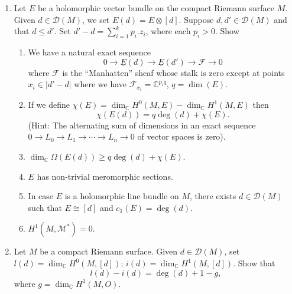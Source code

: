 \begin{enumerate}
\begin{enumerate}[label=\alph*)]
Show that if $(f_1,\ldots,f_m)$ is a regular sequence, then the Koszul complex is exact (Hint: prove by induction on $m$. See also Griffiths and Harris \cite[pages 688--690]{bib:II:griffiths-p-and-harris-j:1}).
\end{enumerate}
Now suppose that $p_j\in\mathbb{C}[z_0,\ldots,z_n]$ is homogeneous of degree $d_j$, $1\leq j\leq m$, and let $p=(p_1,\ldots,p_m)$ denote the corresponding section of $E=O(d_1)\oplus\cdots\oplus O(d_m)$. Set $X=Z(p)\subset\mathbb{P}^n(\mathbb{C})$. Show
\begin{enumerate}[label=\alph*),start=3]
\item If $(p_1,\ldots,p_m)$ is a regular sequence in $\mathbb{C}[z_0,\ldots,z_n]$ then the Koszul complex
\[
\begin{aligned}
0\to\Lambda^m\underline{E}^*\xrightarrow{\partial}\Lambda^{m-1}\underline{E}^*\xrightarrow{\partial}\cdots\xrightarrow{\partial}\Lambda^1\underline{E}^*
\to\mathcal{O}_{\mathbb{P}^n(\mathbb{C})}\to\mathcal{O}_X\to0
\end{aligned}
\]
is a locally free resolution of $\mathcal{O}_X$.
\end{enumerate}
(See also Exercise 14, \hyperref[sec:6:1]{\S1, Chapter 6}. The assumption on $(p_1,\ldots,p_m)$ amounts to saying that $X$ is a \emph{complete intersection}).
\item Let $E$ be a holomorphic vector bundle on the compact Riemann surface $M$. Given $d\in \mathcal{D}(M)$, we set $E(d)=E\otimes[d]$. Suppose $d,d'\in \mathcal{D}(M)$ and that $d\leq d'$. Set $d'-d=\sum_{i=1}^k p_i.z_i$, where each $p_i>0$. Show
\begin{enumerate}[label=\alph*)]
\item We have a natural exact sequence
\[
0\to\underline{E}(d)\to\underline{E}(d')\to\mathcal{F}\to0
\]
where $\mathcal{F}$ is the ``Manhatten'' sheaf whose stalk is zero except at points $x_i\in|d'-d|$ where we have $\mathcal{F}_{x_i}=\mathbb{C}^{p_iq}$, $q=\dim(E)$.
\item If we define $\chi(E)=\dim_{\mathbb{C}}H^0(M,E)-\dim_{\mathbb{C}}H^1(M,E)$ then
\[
\chi(E(d))=q\deg(d)+\chi(E).
\]
(Hint: The alternating sum of dimensions in an exact sequence $0\to L_0\to L_1\to\cdots\to L_n\to0$ of vector spaces is zero).
\item $\dim_{\mathbb{C}}\Omega(E(d))\geq q\deg(d)+\chi(E)$.
\item $E$ has non-trivial meromorphic sections.
\item In case $E$ is a holomorphic line bundle on $M$, there exists $d\in \mathcal{D}(M)$ such that $E\cong[d]$ and $c_1(E)=\deg(d)$.
\item $H^1(M,\mathcal{M}^*)=0$.
\end{enumerate}
\item Let $M$ be a compact Riemann surface. Given $d\in \mathcal{D}(M)$, set $l(d)=\dim_{\mathbb{C}}H^0(M,[d])$; $i(d)=\dim_{\mathbb{C}}H^1(M,[d])$. Show that
\[
l(d)-i(d)=\deg(d)+1-g,
\]
where $g=\dim_{\mathbb{C}}H^1(M,O)$.


\end{enumerate}
